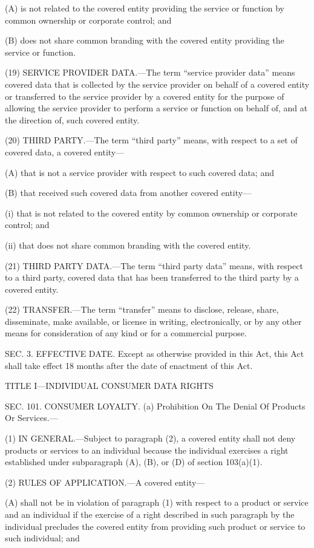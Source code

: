 (A) is not related to the covered entity providing the service or function by common ownership or corporate control; and

(B) does not share common branding with the covered entity providing the service or function.

(19) SERVICE PROVIDER DATA.—The term “service provider data” means covered data that is collected by the service provider on behalf of a covered entity or transferred to the service provider by a covered entity for the purpose of allowing the service provider to perform a service or function on behalf of, and at the direction of, such covered entity.

(20) THIRD PARTY.—The term “third party” means, with respect to a set of covered data, a covered entity—

(A) that is not a service provider with respect to such covered data; and

(B) that received such covered data from another covered entity—

(i) that is not related to the covered entity by common ownership or corporate control; and

(ii) that does not share common branding with the covered entity.

(21) THIRD PARTY DATA.—The term “third party data” means, with respect to a third party, covered data that has been transferred to the third party by a covered entity.

(22) TRANSFER.—The term “transfer” means to disclose, release, share, disseminate, make available, or license in writing, electronically, or by any other means for consideration of any kind or for a commercial purpose.


SEC. 3. EFFECTIVE DATE.
Except as otherwise provided in this Act, this Act shall take effect 18 months after the date of enactment of this Act.

TITLE I—INDIVIDUAL CONSUMER DATA RIGHTS

SEC. 101. CONSUMER LOYALTY.
(a) Prohibition On The Denial Of Products Or Services.—

(1) IN GENERAL.—Subject to paragraph (2), a covered entity shall not deny products or services to an individual because the individual exercises a right established under subparagraph (A), (B), or (D) of section 103(a)(1).

(2) RULES OF APPLICATION.—A covered entity—

(A) shall not be in violation of paragraph (1) with respect to a product or service and an individual if the exercise of a right described in such paragraph by the individual precludes the covered entity from providing such product or service to such individual; and

